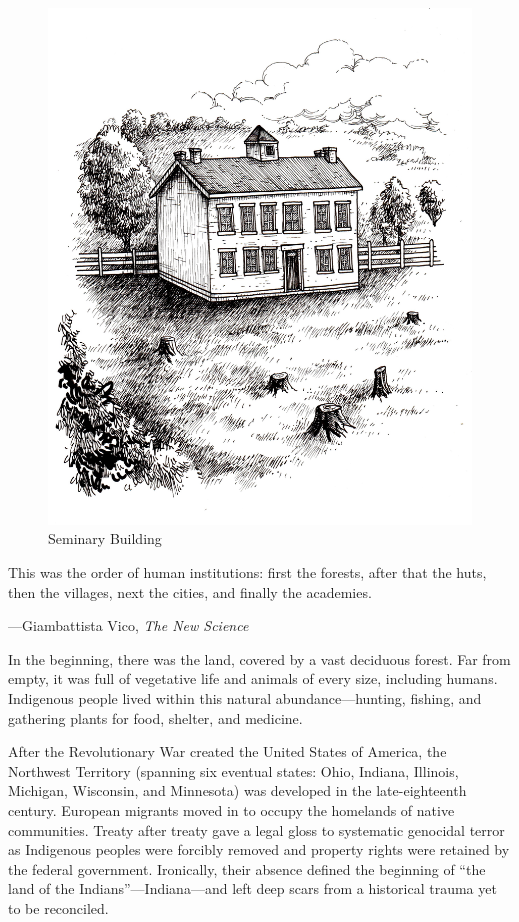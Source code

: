 \documentclass[
  american,
  letterpaper,
]{scrreprt}
\begin{document}
\begin{figure}[H]

{\centering \includegraphics[width=0.6\linewidth,height=\textheight,keepaspectratio]{images/miu1.jpeg}

}

\caption{Seminary Building}

\end{figure}%

\epigraph{
This was the order of human institutions: first the forests, after that the huts, then the villages, next the cities, and finally the academies.} 
{---Giambattista Vico, \textit{The New Science}}

In the beginning, there was the land, covered by a vast deciduous
forest. Far from empty, it was full of vegetative life and animals of
every size, including humans. Indigenous people lived within this
natural abundance---hunting, fishing, and gathering plants for food,
shelter, and medicine.

After the Revolutionary War created the United States of America, the
Northwest Territory (spanning six eventual states: Ohio, Indiana,
Illinois, Michigan, Wisconsin, and Minnesota) was developed in the
late-eighteenth century. European migrants moved in to occupy the
homelands of native communities. Treaty after treaty gave a legal gloss
to systematic genocidal terror as Indigenous peoples were forcibly
removed and property rights were retained by the federal government.
Ironically, their absence defined the beginning of ``the land of the
Indians''---Indiana---and left deep scars from a historical trauma yet
to be reconciled.
\end{document}
